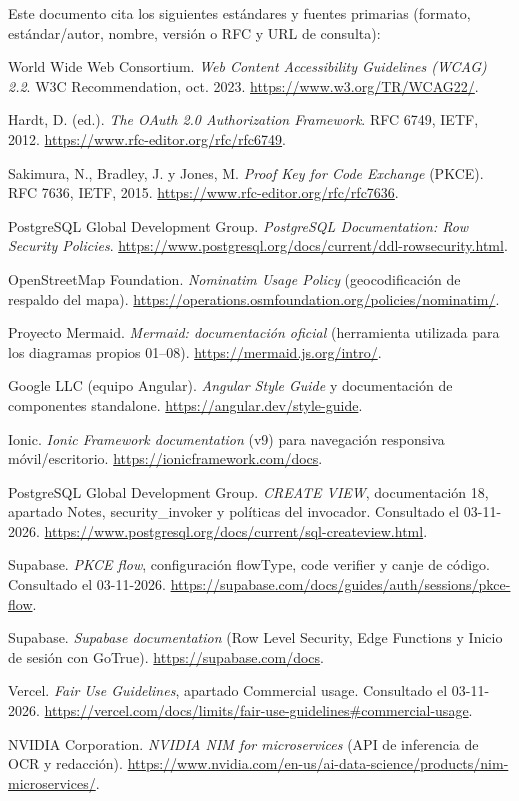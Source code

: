 \documentclass[11pt,a4paper]{article}
\begin{document}
Este documento cita los siguientes estándares y fuentes primarias (formato,
estándar/autor, nombre, versión o RFC y URL de consulta):

\begin{enumerate}[leftmargin=1.6em, label=\textsuperscript{[\arabic*]}]
    \item World Wide Web Consortium. \emph{Web Content Accessibility Guidelines (WCAG) 2.2}. W3C
    Recommendation, oct. 2023. \url{https://www.w3.org/TR/WCAG22/}.
    \item Hardt, D. (ed.). \emph{The OAuth 2.0 Authorization Framework}. RFC 6749, IETF, 2012.
    \url{https://www.rfc-editor.org/rfc/rfc6749}.
    \item Sakimura, N., Bradley, J. y Jones, M. \emph{Proof Key for Code Exchange} (PKCE).
    RFC 7636, IETF, 2015. \url{https://www.rfc-editor.org/rfc/rfc7636}.
    \item PostgreSQL Global Development Group. \emph{PostgreSQL Documentation: Row Security
    Policies}. \url{https://www.postgresql.org/docs/current/ddl-rowsecurity.html}.
    \item OpenStreetMap Foundation. \emph{Nominatim Usage Policy} (geocodificación de respaldo
    del mapa). \url{https://operations.osmfoundation.org/policies/nominatim/}.
    \item Proyecto Mermaid. \emph{Mermaid: documentación oficial} (herramienta utilizada para los diagramas propios 01--08). \url{https://mermaid.js.org/intro/}.
    \item Google LLC (equipo Angular). \emph{Angular Style Guide} y documentación de
    componentes standalone. \url{https://angular.dev/style-guide}.
    \item Ionic. \emph{Ionic Framework documentation} (v9) para navegación responsiva
    móvil/escritorio. \url{https://ionicframework.com/docs}.
    \item PostgreSQL Global Development Group. \emph{CREATE VIEW}, documentación 18,
    apartado Notes, security\_invoker y políticas del invocador. Consultado el 03-11-2026.
    \url{https://www.postgresql.org/docs/current/sql-createview.html}.
    \item Supabase. \emph{PKCE flow}, configuración flowType, code verifier y canje de código.
    Consultado el 03-11-2026. \url{https://supabase.com/docs/guides/auth/sessions/pkce-flow}.
    \item Supabase. \emph{Supabase documentation} (Row Level Security, Edge Functions y
    Inicio de sesión con GoTrue). \url{https://supabase.com/docs}.
    \item Vercel. \emph{Fair Use Guidelines}, apartado Commercial usage.
    \label{ref:vercel-comercial} Consultado el 03-11-2026.
    \url{https://vercel.com/docs/limits/fair-use-guidelines#commercial-usage}.
    \item NVIDIA Corporation. \emph{NVIDIA NIM for microservices} (API de inferencia de OCR y
    redacción). \url{https://www.nvidia.com/en-us/ai-data-science/products/nim-microservices/}.
\end{enumerate}
\end{document}
